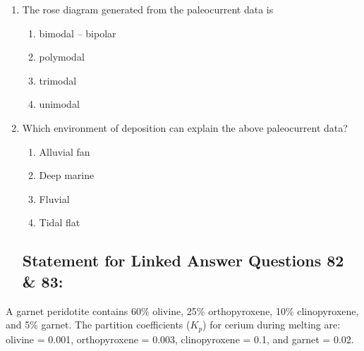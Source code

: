 \documentclass[journal,12pt,onecolumn]{IEEEtran}
\theoremstyle{remark}
\begin{document}
\begin{enumerate}[resume]

\item The rose diagram generated from the paleocurrent data is

\begin{multicols}{2}
\begin{enumerate}
\item bimodal -- bipolar  
\item polymodal  
\item trimodal  
\item unimodal  
\end{enumerate}
\end{multicols}
\vspace{0.5cm}

\item Which environment of deposition can explain the above paleocurrent data?

\begin{multicols}{4}
\begin{enumerate}
\item Alluvial fan  
\item Deep marine  
\item Fluvial  
\item Tidal flat  
\end{enumerate}
\end{multicols}
\vspace{0.5cm}

\subsection*{Statement for Linked Answer Questions 82 \& 83:}
\end{enumerate}
\vspace{0.5cm}

A garnet peridotite contains 60\% olivine, 25\% orthopyroxene, 10\% clinopyroxene, and 5\% garnet. The partition coefficients ($K_p$) for cerium during melting are: olivine = 0.001, orthopyroxene = 0.003, clinopyroxene = 0.1, and garnet = 0.02.
\vspace{0.5cm}
\end{document}
